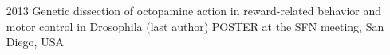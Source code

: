 {}
\begin{itemize}


\item[2013] Genetic dissection of octopamine action in reward-related behavior and motor control in Drosophila (last author) POSTER at the SFN meeting, San Diego, USA

%



%
%
%
%
%


\end{itemize}
